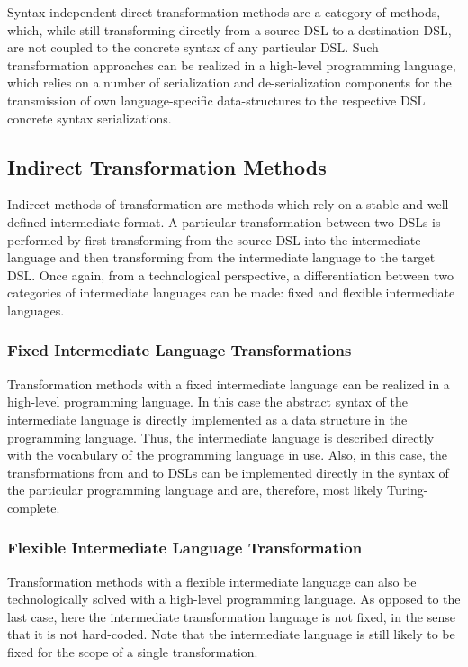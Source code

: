 Syntax-independent direct transformation methods are a category of methods, which, while still transforming directly from a source DSL to a destination DSL, are not coupled to the concrete syntax of any particular DSL. Such transformation approaches can be realized in a high-level programming language, which relies on a number of serialization and de-serialization components for the transmission of own language-specific data-structures to the respective DSL concrete syntax serializations.

\subsection{Indirect Transformation Methods}

Indirect methods of transformation are methods which rely on a stable and well defined intermediate format. A particular transformation between two DSLs is performed by first transforming from the source DSL into the intermediate language and then transforming from the intermediate language to the target DSL. Once again, from a technological perspective, a differentiation between two categories of intermediate languages can be made: fixed and flexible intermediate languages.

\subsubsection{Fixed Intermediate Language Transformations}

Transformation methods with a fixed intermediate language can be realized in a high-level programming language. In this case the abstract syntax of the intermediate language is directly implemented as a data structure in the programming language. Thus, the intermediate language is described directly with the vocabulary of the programming language in use. Also, in this case, the transformations from and to DSLs can be implemented directly in the syntax of the particular programming language and are, therefore, most likely Turing-complete.

\subsubsection{Flexible Intermediate Language Transformation}

Transformation methods with a flexible intermediate language can also be technologically solved with a high-level programming language. As opposed to the last case, here the intermediate transformation language is not fixed, in the sense that it is not hard-coded. Note that the intermediate language is still likely to be fixed for the scope of a single transformation.

